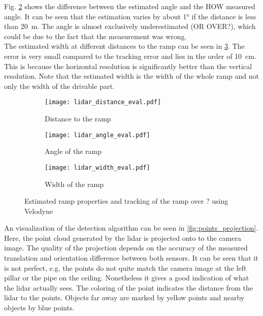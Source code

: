 Fig. \ref{fig:lidar_angle_eval} shows the difference between the estimated angle and the HOW measured angle.
It can be seen that the estimation varies by about \ang{1} if the distance is less than \SI{20}{\metre}.
The angle is almost exclusively underestimated (OR OVER?), which could be due to the fact that the measurement was wrong.\\
The estimated width at different distances to the ramp can be seen in \ref{fig:lidar_width_eval}.
The error is very small compared to the tracking error and lies in the order of \SI{10}{\cm}.
This is because the horizontal resolution is significantly better than the vertical resolution.
Note that the estimated width is the width of the whole ramp and not only the width of the drivable part.\\
\begin{figure}[htbp]
	\centering
	\begin{subfigure}{1\textwidth}
		\centering
		\texttt{[image: lidar\_distance\_eval.pdf]}
		\caption{Distance to the ramp}
		\label{fig:lidar_distance_eval}
	\end{subfigure}
	
	\begin{subfigure}{1\textwidth}
		\centering
		\texttt{[image: lidar\_angle\_eval.pdf]}
		\caption{Angle of the ramp}
		\label{fig:lidar_angle_eval}
	\end{subfigure}
	
	\begin{subfigure}{1\textwidth}
		\centering
		\texttt{[image: lidar\_width\_eval.pdf]}
		\caption{Width of the ramp}
		\label{fig:lidar_width_eval}
	\end{subfigure}
	\caption{Estimated ramp properties and tracking of the ramp over ? using Velodyne}
	\label{fig:lidar_eval}
\end{figure}
An visualization of the detection algorithm can be seen in \cref{fig:points_projection}.
Here, the point cloud generated by the \gls{lidar} is projected onto to the camera image.
The quality of the projection depends on the accuracy of the measured translation and orientation difference between both sensors.
It can be seen that it is not perfect, e.g. the points do not quite match the camera image at the left pillar or the pipe on the ceiling.
Nonetheless it gives a good indication of what the \gls{lidar} actually sees.
The coloring of the point indicates the distance from the \gls{lidar} to the points.
Objects far away are marked by yellow points and nearby objects by blue points.
